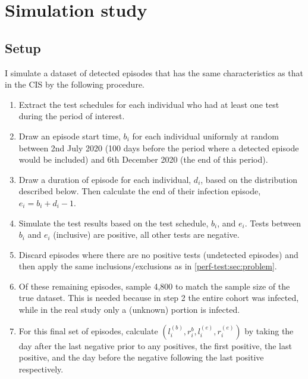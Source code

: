 \documentclass[thesis.tex]{subfiles}
\begin{document}
\section{Simulation study} \label{perf-test:sec:simulation-study}

\subsection{Setup}

I simulate a dataset of detected episodes that has the same characteristics as that in the CIS by the following procedure.
\begin{enumerate}
    \item Extract the test schedules for each individual who had at least one test during the period of interest.
    \item Draw an episode start time, $b_i$ for each individual uniformly at random between 2nd July 2020 (100 days before the period where a detected episode would be included) and 6th December 2020 (the end of this period).
    \item Draw a duration of episode for each individual, $d_i$, based on the distribution described below. Then calculate the end of their infection episode, $e_i = b_i + d_i - 1$.
    \item Simulate the test results based on the test schedule, $b_i$, and $e_i$. Tests between $b_i$ and $e_i$ (inclusive) are positive, all other tests are negative.
    \item Discard episodes where there are no positive tests (\ie undetected episodes) and then apply the same inclusions/exclusions as in \cref{perf-test:sec:problem}.
    \item Of these remaining episodes, sample 4,800 to match the sample size of the true dataset. This is needed because in step 2 the entire cohort was infected, while in the real study only a (unknown) portion is infected.
    \item For this final set of episodes, calculate $(l_i^{(b)}, r_i^{b}, l_i^{(e)}, r_i^{(e)})$ by taking the day after the last negative prior to any positives, the first positive, the last positive, and the day before the negative following the last positive respectively.
\end{enumerate}
\end{document}
